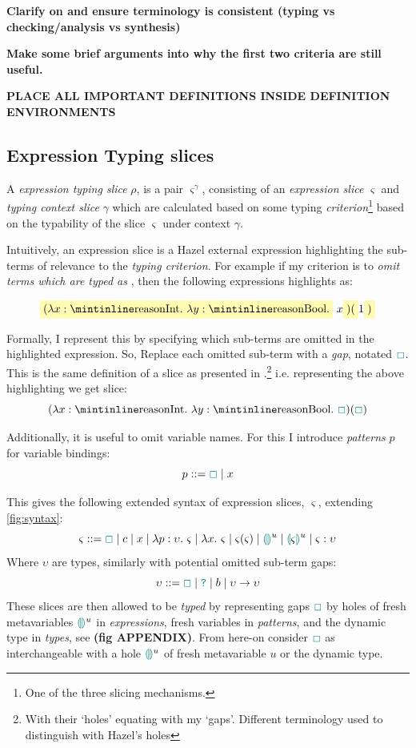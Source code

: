 \textbf{Clarify on and ensure terminology is consistent (typing vs checking/analysis vs synthesis)}

\textbf{Make some brief arguments into why the first two criteria are still useful.}

\textbf{PLACE ALL IMPORTANT DEFINITIONS INSIDE DEFINITION ENVIRONMENTS}

\subsection{Expression Typing slices}\label{sec:ExpressionTypingSlices}
A \textit{expression typing slice} $\rho$, is a pair $\varsigma^\gamma$, consisting of an \textit{expression slice} $\varsigma$ and \textit{typing context slice} $\gamma$ which are calculated based on some typing \textit{criterion}\footnote{One of the three slicing mechanisms.} based on the typability of the slice $\varsigma$ under context $\gamma$. 

Intuitively, an expression slice is a Hazel external expression highlighting the sub-terms of relevance to the \textit{typing criterion}. For example if my criterion is to \textit{omit terms which are typed as} , then the following expressions highlights as:

\[\hlcmaths[yellow!30]{(\lambda x: \code{Int}.\ \lambda y : \code{Bool}.}\ x\hlcmaths[yellow!30]{)(}1\hlcmaths[yellow!30]{)}\]

Formally, I represent this by specifying which sub-terms are omitted in the highlighted expression. So, Replace each omitted sub-term with a \textit{gap}, notated $\gap$. This is the same definition of a slice as presented in \cite{FunctionalProgExplain}.\footnote{With their `holes' equating with my `gaps'. Different terminology used to distinguish with Hazel's holes} i.e. representing the above highlighting we get slice:
\[(\lambda x : \code{Int}.\ \lambda y : \code{Bool}.\ \gap)(\gap)\]


Additionally, it is useful to omit variable names. For this I introduce \textit{patterns} $p$ for variable bindings: 
\[p ::= \gap \mid x\]

This gives the following extended syntax of expression slices, $\varsigma$, extending \cref{fig:syntax}:
\[\varsigma ::= \gap \mid  c \mid x \mid \lambda p : \upsilon.\ \varsigma \mid \lambda x.\ \varsigma \mid \varsigma(\varsigma) \mid \hole^u \mid \hole[\varsigma]^u \mid \varsigma : \upsilon\]
Where $\upsilon$ are types, similarly with potential omitted sub-term gaps:
\[\upsilon ::= \gap \mid \dyn \mid b \mid \upsilon \to \upsilon\]
These slices are then allowed to be \textit{typed} by representing gaps $\gap$ by holes of fresh metavariables $\hole^u$ in \textit{expressions}, fresh variables in \textit{patterns}, and the dynamic type in \textit{types}, see \textbf{(fig APPENDIX)}. From here-on consider $\gap$ as interchangeable with a hole $\hole^u$ of fresh metavariable $u$ or the dynamic type.

